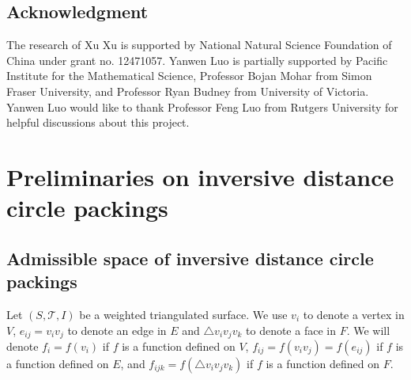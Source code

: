 \documentclass[12pt]{amsart}
\begin{document}
\subsection{Acknowledgment}
The research of Xu Xu is supported by National Natural Science Foundation of China under grant no. 12471057.
Yanwen Luo is partially supported by Pacific Institute for the Mathematical Science, Professor Bojan Mohar from Simon Fraser University, and Professor Ryan Budney from University of Victoria. Yanwen Luo would like to thank Professor Feng Luo from Rutgers University for helpful discussions about this project.



\section{Preliminaries on inversive distance circle packings}\label{section 2}






\subsection{Admissible space of inversive distance circle packings}
Let $(S, \mathcal{T}, I)$ be a weighted triangulated surface.
 We use $v_i$ to denote a vertex in $V$, $e_{ij} = v_iv_j$ to denote an edge in $E$ and $\triangle v_iv_jv_k$ to denote a face in $F$.
We will denote $f_i = f(v_i)$ if $f$ is a function defined on $V$,  $f_{ij} = f(v_iv_j) = f(e_{ij})$ if $f$ is a function defined on $E$, and $f_{ijk} = f(\triangle v_iv_jv_k)$ if $f$ is a function defined on $F$.
\end{document}

